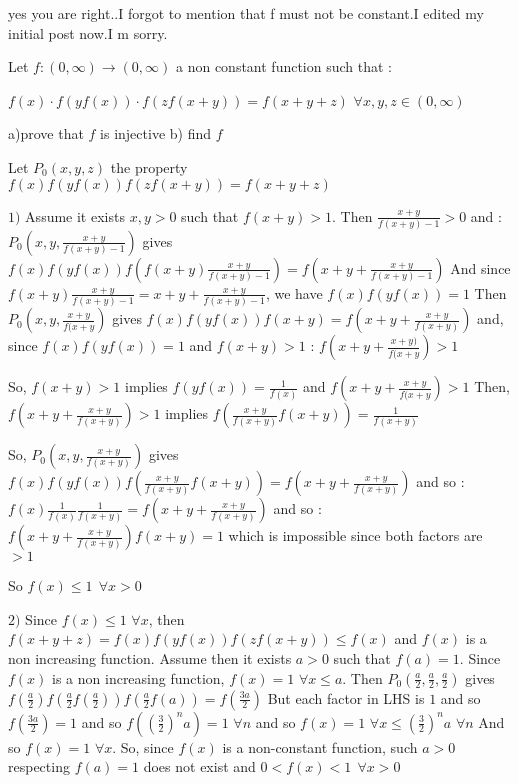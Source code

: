 \begin{mysolution}

yes you are right..I forgot to mention that f must not be constant.I edited my initial post now.I m sorry.
\end{mysolution}



\begin{mysolution}
	\begin{tcolorbox}Let $ f: (0,\infty) \rightarrow (0,\infty)$ a non constant function  such that : 

$ f(x)\cdot f(yf(x))\cdot f(zf(x + y)) = f(x + y + z)$ $ \forall x,y,z \in (0 ,\infty)$ 

a)prove that $ f$ is injective 
b) find $ f$\end{tcolorbox}

Let $ P_0(x,y,z)$ the property $ f(x) f(yf(x)) f(zf(x + y)) = f(x + y + z)$

$ 1)$ Assume it exists $ x,y>0$ such that $ f(x+y)>1$. Then $ \frac{x+y}{f(x+y)-1}>0$ and :
$ P_0(x,y,\frac{x+y}{f(x+y)-1})$ gives $ f(x)f(yf(x))f(f(x+y)\frac{x+y}{f(x+y)-1})=f(x+y+\frac{x+y}{f(x+y)-1})$
And since $ f(x+y)\frac{x+y}{f(x+y)-1}=x+y+\frac{x+y}{f(x+y)-1}$, we have $ f(x)f(yf(x))=1$
Then $ P_0(x,y,\frac{x+y}{f(x+y})$ gives $ f(x)f(yf(x))f(x+y)=f(x+y+\frac{x+y}{f(x+y)})$ and, since $ f(x)f(yf(x))=1$ and $ f(x+y)>1$ :
$ f(x+y+\frac{x+y)}{f(x+y})>1$

So, $ f(x+y)>1$ implies $ \boxed{f(yf(x))=\frac{1}{f(x)}}$ and $ f(x+y+\frac{x+y}{f(x+y})>1$
Then, $ f(x+y+\frac{x+y}{f(x+y)})>1$ implies $ \boxed{f(\frac{x+y}{f(x+y)}f(x+y))=\frac{1}{f(x+y)}}$

So, $ P_0(x,y,\frac{x+y}{f(x+y)})$ gives $ f(x)f(yf(x))f(\frac{x+y}{f(x+y)}f(x+y))=f(x+y+\frac{x+y}{f(x+y)})$ and so :
$ f(x)\frac{1}{f(x)}\frac{1}{f(x+y)}=f(x+y+\frac{x+y}{f(x+y)})$ and so :
$ f(x+y+\frac{x+y}{f(x+y)})f(x+y)=1$  which is impossible since both factors are $ >1$

So $ \boxed{f(x)\leq 1\: \: \forall x>0}$

$ 2)$ Since $ f(x)\leq 1$ $ \forall x$, then $ f(x+y+z)=f(x)f(yf(x))f(zf(x+y))\leq f(x)$ and $ f(x)$ is a non increasing function.
Assume then it exists $ a>0$ such that $ f(a)=1$.
Since $ f(x)$ is a non increasing function, $ f(x)=1$ $ \forall x\leq a$.
Then $ P_0(\frac{a}{2}, \frac{a}{2},\frac{a}{2})$ gives $ f(\frac{a}{2})f(\frac{a}{2}f(\frac{a}{2}))f(\frac{a}{2}f(a))=f(\frac{3a}{2})$
But each factor in LHS is $ 1$ and so $ f(\frac{3a}{2})=1$ and so $ f((\frac{3}{2})^na)=1$ $ \forall n$ and so $ f(x)=1$ $ \forall x\leq (\frac{3}{2})^na$ $ \forall n$
And so $ f(x)=1$ $ \forall x$.
So, since $ f(x)$ is a non-constant function, such $ a>0$ respecting $ f(a)=1$ does not exist and 
$ \boxed{0<f(x)<1\: \: \forall x>0}$  


\end{mysolution}
